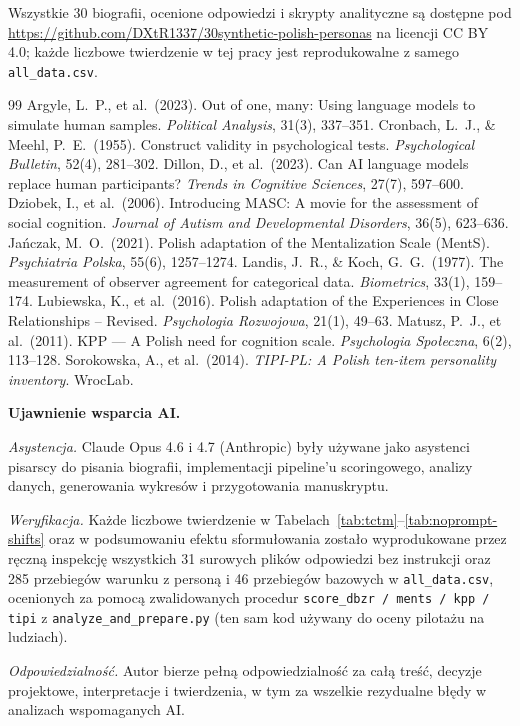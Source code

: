 \documentclass[11pt,a4paper]{article}
\begin{document}
Wszystkie 30 biografii, ocenione odpowiedzi i skrypty analityczne są dostępne pod \url{https://github.com/DXtR1337/30synthetic-polish-personas} na licencji CC BY 4.0; każde liczbowe twierdzenie w tej pracy jest reprodukowalne z samego \texttt{all\_data.csv}.

\begin{thebibliography}{99}\footnotesize
{} Argyle, L.~P., et al.\ (2023). Out of one, many: Using language models to simulate human samples. \textit{Political Analysis}, 31(3), 337--351.
 Cronbach, L.~J., \& Meehl, P.~E.\ (1955). Construct validity in psychological tests. \textit{Psychological Bulletin}, 52(4), 281--302.
 Dillon, D., et al.\ (2023). Can AI language models replace human participants? \textit{Trends in Cognitive Sciences}, 27(7), 597--600.
 Dziobek, I., et al.\ (2006). Introducing MASC: A movie for the assessment of social cognition. \textit{Journal of Autism and Developmental Disorders}, 36(5), 623--636.
 Ja\'nczak, M.~O.\ (2021). Polish adaptation of the Mentalization Scale (MentS). \textit{Psychiatria Polska}, 55(6), 1257--1274.
 Landis, J.~R., \& Koch, G.~G.\ (1977). The measurement of observer agreement for categorical data. \textit{Biometrics}, 33(1), 159--174.
 Lubiewska, K., et al.\ (2016). Polish adaptation of the Experiences in Close Relationships -- Revised. \textit{Psychologia Rozwojowa}, 21(1), 49--63.
 Matusz, P.~J., et al.\ (2011). KPP --- A Polish need for cognition scale. \textit{Psychologia Spo{\l}eczna}, 6(2), 113--128.
 Sorokowska, A., et al.\ (2014). \textit{TIPI-PL: A Polish ten-item personality inventory}. WrocLab.
\end{thebibliography}

\vspace{8pt}
\noindent\textbf{Ujawnienie wsparcia AI.}

\noindent\textit{Asystencja.} Claude Opus 4.6 i 4.7 (Anthropic) były używane jako asystenci pisarscy do pisania biografii, implementacji pipeline'u scoringowego, analizy danych, generowania wykresów i przygotowania manuskryptu.

\noindent\textit{Weryfikacja.} Każde liczbowe twierdzenie w Tabelach~\ref{tab:tctm}--\ref{tab:noprompt-shifts} oraz w podsumowaniu efektu sformułowania zostało wyprodukowane przez ręczną inspekcję wszystkich 31 surowych plików odpowiedzi bez instrukcji oraz 285 przebiegów warunku z personą i 46 przebiegów bazowych w \texttt{all\_data.csv}, ocenionych za pomocą zwalidowanych procedur \texttt{score\_dbzr / ments / kpp / tipi} z \texttt{analyze\_and\_prepare.py} (ten sam kod używany do oceny pilotażu na ludziach).

\noindent\textit{Odpowiedzialność.} Autor bierze pełną odpowiedzialność za całą treść, decyzje projektowe, interpretacje i twierdzenia, w tym za wszelkie rezydualne błędy w analizach wspomaganych AI.
\end{document}
